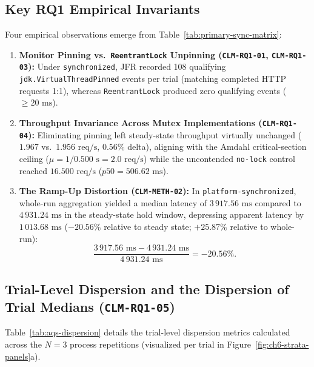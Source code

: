 \subsection{Key RQ1 Empirical Invariants}
Four empirical observations emerge from Table~\ref{tab:primary-sync-matrix}:
\begin{enumerate}
  \item \textbf{Monitor Pinning vs.\ \texttt{ReentrantLock} Unpinning (\texttt{CLM-RQ1-01}, \texttt{CLM-RQ1-03}):} Under \texttt{synchronized}, JFR recorded 108 qualifying \texttt{jdk.VirtualThreadPinned} events per trial (matching completed HTTP requests 1:1), whereas \texttt{ReentrantLock} produced zero qualifying events ($\ge 20\text{ ms}$).
  \item \textbf{Throughput Invariance Across Mutex Implementations (\texttt{CLM-RQ1-04}):} Eliminating pinning left steady-state throughput virtually unchanged ($1.967$ vs.\ $1.956\text{ req/s}$, $0.56\%$ delta), aligning with the Amdahl critical-section ceiling ($\mu = 1/0.500\text{ s} = 2.0\text{ req/s}$) while the uncontended \texttt{no-lock} control reached $16.500\text{ req/s}$ ($p50 = 506.62\text{ ms}$).
  \item \textbf{The Ramp-Up Distortion (\texttt{CLM-METH-02}):} In \texttt{platform-synchronized}, whole-run aggregation yielded a median latency of $3\,917.56\text{ ms}$ compared to $4\,931.24\text{ ms}$ in the steady-state hold window, depressing apparent latency by $1\,013.68\text{ ms}$ ($-20.56\%$ relative to steady state; $+25.87\%$ relative to whole-run):
  \begin{equation}
    \frac{3\,917.56\text{ ms} - 4\,931.24\text{ ms}}{4\,931.24\text{ ms}} = -20.56\%.
  \end{equation}
\end{enumerate}

\subsection[Trial-Level Dispersion and the Dispersion of Trial Medians (CLM-RQ1-05)]{Trial-Level Dispersion and the Dispersion of Trial Medians (\texttt{CLM-RQ1-05})}
Table~\ref{tab:aqs-dispersion} details the trial-level dispersion metrics calculated across the $N=3$ process repetitions (visualized per trial in Figure~\ref{fig:ch6-strata-panels}a).


